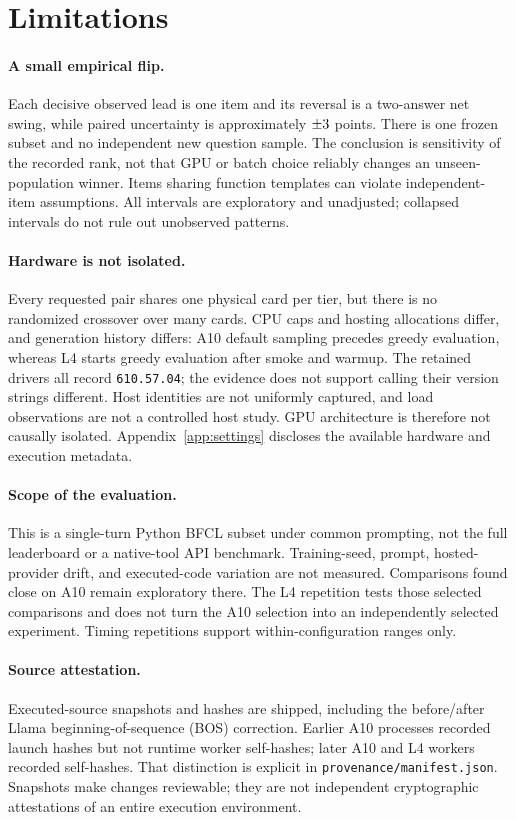 \documentclass[10pt,twocolumn]{article}
\newcommand{\code}[1]{\texttt{#1}}
\begin{document}
\section{Limitations}
\paragraph{A small empirical flip.}
Each decisive observed lead is one item and its reversal is a two-answer net swing, while paired uncertainty is approximately $\pm3{}$ points. There is one frozen subset and no independent new question sample. The conclusion is sensitivity of the recorded rank, not that GPU or batch choice reliably changes an unseen-population winner. Items sharing function templates can violate independent-item assumptions. All intervals are exploratory and unadjusted; collapsed intervals do not rule out unobserved patterns.

\paragraph{Hardware is not isolated.}
Every requested pair shares one physical card per tier, but there is no randomized crossover over many cards. CPU caps and hosting allocations differ, and generation history differs: A10 default sampling precedes greedy evaluation, whereas L4 starts greedy evaluation after smoke and warmup. The retained drivers all record \code{610.57.04}; the evidence does not support calling their version strings different. Host identities are not uniformly captured, and load observations are not a controlled host study. GPU architecture is therefore not causally isolated. Appendix~\ref{app:settings} discloses the available hardware and execution metadata.

\paragraph{Scope of the evaluation.}
This is a single-turn Python BFCL subset under common prompting, not the full leaderboard or a native-tool API benchmark. Training-seed, prompt, hosted-provider drift, and executed-code variation are not measured. Comparisons found close on A10 remain exploratory there. The L4 repetition tests those selected comparisons and does not turn the A10 selection into an independently selected experiment. Timing repetitions support within-configuration ranges only.

\paragraph{Source attestation.}
Executed-source snapshots and hashes are shipped, including the before/after Llama beginning-of-sequence (BOS) correction. Earlier A10 processes recorded launch hashes but not runtime worker self-hashes; later A10 and L4 workers recorded self-hashes. That distinction is explicit in \code{provenance/manifest.json}. Snapshots make changes reviewable; they are not independent cryptographic attestations of an entire execution environment.
\end{document}

